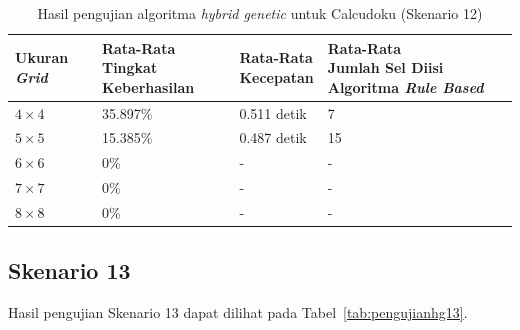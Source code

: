 \begin{table}
\centering
\captionsetup{justification=centering}
\caption[Hasil pengujian algoritma \textit{hybrid genetic} untuk Calcudoku (Skenario 12)]{Hasil pengujian algoritma \textit{hybrid genetic} untuk Calcudoku (Skenario 12)}
\begin{tabular}{| l | l | l | l |}
\hline
Ukuran \textit{Grid} & \makecell[l]{Rata-Rata \\ Tingkat Keberhasilan} & \makecell[l]{Rata-Rata \\ Kecepatan} & \makecell[l]{Rata-Rata \\ Jumlah Sel Diisi Algoritma \textit{Rule Based}} \\
\hline \hline
\begin{math}4 \times 4\end{math} & 35.897\% & 0.511 detik & 7 \\
\hline
\begin{math}5 \times 5\end{math} & 15.385\% & 0.487 detik & 15 \\
\hline
\begin{math}6 \times 6\end{math} & 0\% & - & - \\
\hline
\begin{math}7 \times 7\end{math} & 0\% & - & - \\
\hline
\begin{math}8 \times 8\end{math} & 0\% & - & - \\
\hline
\end{tabular}
\label{tab:pengujianhg12}
\end{table}

\subsection{Skenario 13}
\label{sec:skenario13}

Hasil pengujian Skenario 13 dapat dilihat pada Tabel~\ref{tab:pengujianhg13}.

